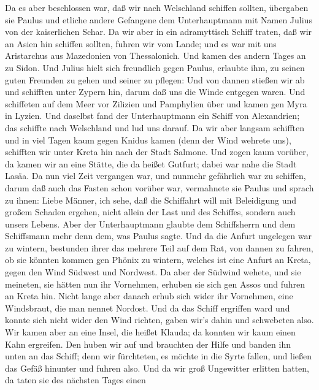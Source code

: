  Da es aber beschlossen war, daß wir nach Welschland
schiffen sollten, übergaben sie Paulus und etliche andere Gefangene dem
Unterhauptmann mit Namen Julius von der kaiserlichen Schar. 
Da wir aber in ein adramyttisch Schiff traten, daß wir an Asien hin
schiffen sollten, fuhren wir vom Lande; und es war mit uns Aristarchus
aus Mazedonien von Thessalonich.  Und kamen des andern Tages
an zu Sidon. Und Julius hielt sich freundlich gegen Paulus, erlaubte
ihm, zu seinen guten Freunden zu gehen und seiner zu pflegen:
 Und von dannen stießen wir ab und schifften unter Zypern
hin, darum daß uns die Winde entgegen waren.  Und schiffeten
auf dem Meer vor Zilizien und Pamphylien über und kamen gen Myra in
Lyzien.  Und daselbst fand der Unterhauptmann ein Schiff von
Alexandrien; das schiffte nach Welschland und lud uns darauf.
 Da wir aber langsam schifften und in viel Tagen kaum gegen
Knidus kamen (denn der Wind wehrete uns), schifften wir unter Kreta hin
nach der Stadt Salmone.  Und zogen kaum vorüber, da kamen
wir an eine Stätte, die da heißet Gutfurt; dabei war nahe die Stadt
Lasäa.  Da nun viel Zeit vergangen war, und nunmehr
gefährlich war zu schiffen, darum daß auch das Fasten schon vorüber war,
vermahnete sie Paulus  und sprach zu ihnen: Liebe Männer,
ich sehe, daß die Schiffahrt will mit Beleidigung und großem Schaden
ergehen, nicht allein der Last und des Schiffes, sondern auch unsers
Lebens.  Aber der Unterhauptmann glaubte dem Schiffsherrn
und dem Schiffsmann mehr denn dem, was Paulus sagte.  Und
da die Anfurt ungelegen war zu wintern, bestunden ihrer das mehrere Teil
auf dem Rat, von dannen zu fahren, ob sie könnten kommen gen Phönix zu
wintern, welches ist eine Anfurt an Kreta, gegen den Wind Südwest und
Nordwest.  Da aber der Südwind wehete, und sie meineten,
sie hätten nun ihr Vornehmen, erhuben sie sich gen Assos und fuhren an
Kreta hin.  Nicht lange aber danach erhub sich wider ihr
Vornehmen, eine Windsbraut, die man nennet Nordost.  Und da
das Schiff ergriffen ward und konnte sich nicht wider den Wind richten,
gaben wir's dahin und schwebeten also.  Wir kamen aber an
eine Insel, die heißet Klauda; da konnten wir kaum einen Kahn ergreifen.
 Den huben wir auf und brauchten der Hilfe und banden ihn
unten an das Schiff; denn wir fürchteten, es möchte in die Syrte fallen,
und ließen das Gefäß hinunter und fuhren also.  Und da wir
groß Ungewitter erlitten hatten, da taten sie des nächsten Tages einen
